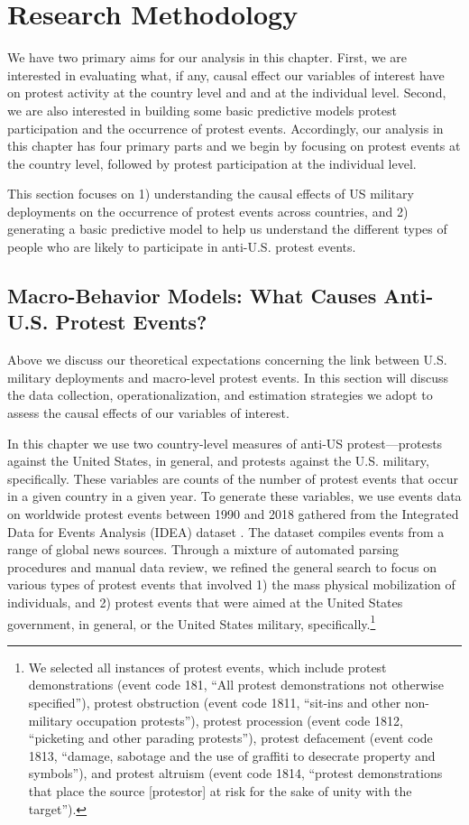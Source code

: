 \section*{Research Methodology}

We have two primary aims for our analysis in this chapter. First, we are interested in evaluating what, if any, causal effect our variables of interest have on protest activity at the country level and and at the individual level. Second, we are also interested in building some basic predictive models protest participation and the occurrence of protest events. Accordingly, our analysis in this chapter has four primary parts and we begin by focusing on protest events at the country level, followed by protest participation at the individual level. 

This section focuses on 1) understanding the causal effects of US military deployments on the occurrence of protest events across countries, and 2) generating a basic predictive model to help us understand the different types of people who are likely to participate in anti-U.S. protest events.



\subsection*{Macro-Behavior Models: What Causes Anti-U.S. Protest Events?}

Above we discuss our theoretical expectations concerning the link between U.S. military deployments and macro-level protest events. In this section will discuss the data collection, operationalization, and estimation strategies we adopt to assess the causal effects of our variables of interest. 

In this chapter we use two country-level measures of anti-US protest---protests against the United States, in general, and protests against the U.S. military, specifically. These variables are counts of the number of protest events that occur in a given country in a given year. To generate these variables, we use events data on worldwide protest events between 1990 and 2018 gathered from the Integrated Data for Events Analysis (IDEA) dataset \cite{Bond2003}. The dataset compiles events from a range of global news sources. Through a mixture of automated parsing procedures and manual data review, we refined the general search to focus on various types of protest events that involved 1) the mass physical mobilization of individuals, and 2) protest events that were aimed at the United States government, in general, or the United States military, specifically.\footnote{We selected all instances of protest events, which include protest demonstrations (event code 181, ``All protest demonstrations not otherwise specified''), protest obstruction (event code 1811, ``sit-ins and other non-military occupation protests''), protest procession (event code 1812, ``picketing and other parading protests''), protest defacement (event code 1813, ``damage, sabotage and the use of graffiti to desecrate property and symbols''), and protest altruism (event code 1814, ``protest demonstrations that place the source [protestor] at risk for the sake of unity with the target'').}

